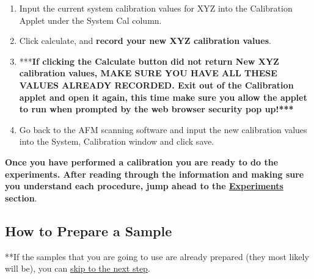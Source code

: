 \documentclass{../lab}
\begin{document}
\begin{enumerate}
    \item Input the current system calibration values for XYZ into the Calibration Applet under the System Cal column.

    \item Click calculate, and \textbf{record your new XYZ calibration values}.

    \item ***\textbf{If clicking the Calculate button did not return New XYZ calibration values, MAKE SURE YOU HAVE ALL THESE VALUES ALREADY RECORDED.  Exit out of the Calibration applet and open it again, this time make sure you allow the applet to run when prompted by the web browser security pop up!***}

    \item Go back to the AFM scanning software and input the new calibration values into the System, Calibration window and click save.
\end{enumerate}

\textbf{Once you have performed a calibration you are ready to do the experiments.  After reading through the information and making sure you understand each procedure, jump ahead to the \hyperref[sec:Experiments]{Experiments} section}.

\subsection{How to Prepare a Sample}
\label{subsec:HowToPrepareASample}

**If the samples that you are going to use are already prepared (they most likely will be), you can \hyperref[subsec:TipApproach]{skip to the next step}.
\end{document}
